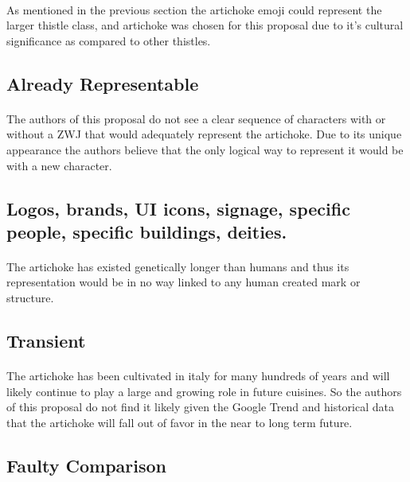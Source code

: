 \documentclass[11pt, oneside,a4paper]{article}
\begin{document}
        \paragraph{}
        As mentioned in the previous section the artichoke emoji could represent the larger thistle class, and artichoke was chosen for this proposal due to it's cultural significance as compared to other thistles.
    
    \subsection{Already Representable}
      \paragraph{}
      The authors of this proposal do not see a clear sequence of characters with or without a ZWJ that would adequately represent the artichoke. Due to its unique appearance the authors believe that the only logical way to represent it would be with a new character.

    \subsection{Logos, brands, UI icons, signage, specific people, specific buildings, deities.}
        \paragraph{}
        The artichoke has existed genetically longer than humans and thus its representation would be in no way linked to any human created mark or structure.

    \subsection{Transient}
        \paragraph{}
        The artichoke has been cultivated in italy for many hundreds of years and will likely continue to play a large and growing role in future cuisines. So the authors of this proposal do not find it likely given the Google Trend and historical data that the artichoke will fall out of favor in the near to long term future.
    
    \subsection{Faulty Comparison}
\end{document}
